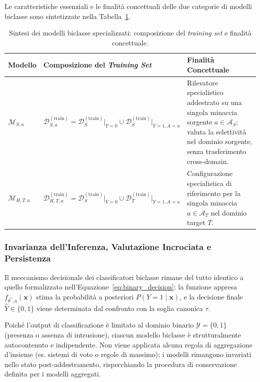 Le caratteristiche essenziali e le finalità concettuali delle due categorie di modelli biclasse sono sintetizzate nella Tabella~\ref{tab:modelli_biclasse}.

\begin{table}[H]
    \centering
    \small
    \caption{Sintesi dei modelli biclasse specializzati: composizione del \textit{training set} e finalità concettuale.}
    \label{tab:modelli_biclasse}
    \begin{tabularx}{\textwidth}{l l >{\raggedright\arraybackslash}X }
        \toprule
        \textbf{Modello} & \textbf{Composizione del \textit{Training Set}} & \textbf{Finalità Concettuale} \\
        \midrule
        $\mathcal{M}_{S, a}$ &
        $\mathcal{D}_{S, a}^{(\text{train})} = \mathcal{D}_{S}^{(\text{train})}\big|_{Y=0} \cup \mathcal{D}_{S}^{(\text{train})}\big|_{Y=1, A=a}$ &
        Rilevatore specialistico addestrato su una singola minaccia sorgente $a \in \mathcal{A}_S$; valuta la selettività nel dominio sorgente, senza trasferimento cross-domain. \\
        \addlinespace
        $\mathcal{M}_{H, T, a}$ &
        $\mathcal{D}_{H, T, a}^{(\text{train})} = \mathcal{D}_{S}^{(\text{train})}\big|_{Y=0} \cup \mathcal{D}_{T}^{(\text{train})}\big|_{Y=1, A=a}$ &
        Configurazione specialistica di riferimento per la singola minaccia $a \in \mathcal{A}_T$ nel dominio target $T$. \\
        \bottomrule
    \end{tabularx}
\end{table}

\subsubsection{Invarianza dell'Inferenza, Valutazione Incrociata e Persistenza}
\label{subsubsec:invarianza_biclasse}
Il meccanismo decisionale dei classificatori biclasse rimane del tutto identico a quello formalizzato nell'Equazione~\eqref{eq:binary_decision}: la funzione appresa $f_{\theta^*, a}(\mathbf{x})$ stima la probabilità a posteriori $P(Y = 1 \mid \mathbf{x})$, e la decisione finale $\hat{Y} \in \{0, 1\}$ viene determinata dal confronto con la soglia canonica $\tau$.

Poiché l'output di classificazione è limitato al dominio binario $\mathcal{Y} = \{0, 1\}$ (presenza o assenza di intrusione), ciascun modello biclasse è strutturalmente autocontenuto e indipendente. Non viene applicata alcuna regola di aggregazione d'insieme (es. sistemi di voto o regole di massimo); i modelli rimangono invariati nello stato post-addestramento, rispecchiando la procedura di conservazione definita per i modelli aggregati.


